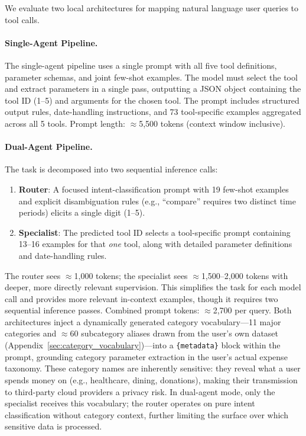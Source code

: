 \documentclass[11pt,twocolumn]{article}
\begin{document}
We evaluate two local architectures for mapping natural language user
queries to tool calls.

\paragraph{Single-Agent Pipeline.}
The single-agent pipeline uses a single prompt with all five tool
definitions, parameter schemas, and joint few-shot examples.
The model must select the tool and extract parameters in a single
pass, outputting a JSON object containing the tool ID (1--5) and
arguments for the chosen tool.
The prompt includes structured output rules, date-handling
instructions, and 73 tool-specific examples aggregated across all 5
tools.
Prompt length: $\approx$5,500 tokens (context window inclusive).

\paragraph{Dual-Agent Pipeline.}
The task is decomposed into two sequential inference calls:
\begin{enumerate}
    \item \textbf{Router}: A focused intent-classification prompt
          with 19 few-shot examples and explicit disambiguation rules
          (e.g., ``compare'' requires two distinct time periods) elicits
          a single digit (1--5).
    \item \textbf{Specialist}: The predicted tool ID selects a
          tool-specific prompt containing 13--16 examples for that
          \emph{one} tool, along with detailed parameter definitions
          and date-handling rules.
\end{enumerate}
The router sees $\approx$1,000 tokens; the specialist sees
$\approx$1,500--2,000 tokens with deeper, more directly relevant
supervision.
This simplifies the task for each model call and provides more
relevant in-context examples, though it requires two sequential
inference passes.
Combined prompt tokens: $\approx$2,700 per query.
Both architectures inject a dynamically generated category
vocabulary---11 major categories and $\approx$60 subcategory
aliases drawn from the user's own dataset
(Appendix~\ref{sec:category_vocabulary})---into a
\texttt{\{metadata\}} block within the prompt, grounding category
parameter extraction in the user's actual expense taxonomy.
These category names are inherently sensitive: they reveal what
a user spends money on (e.g., healthcare, dining, donations),
making their transmission to third-party cloud providers a
privacy risk.
In dual-agent mode, only the specialist receives this vocabulary;
the router operates on pure intent classification without category
context, further limiting the surface over which sensitive data is
processed.
\end{document}
